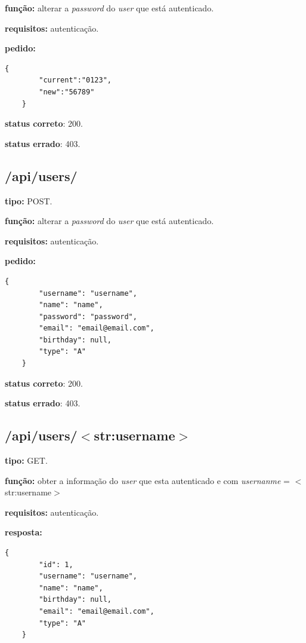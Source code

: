 \documentclass[11pt,a4paper]{report}
\begin{document}
\textbf{função:} alterar a \emph{password} do \emph{user} que está autenticado.

\textbf{requisitos:} autenticação.

\textbf{pedido:}

\begin{lstlisting}[style = code]
   {
        "current":"0123",
        "new":"56789"
    }
\end{lstlisting}

\textbf{status correto}: 200.

\textbf{status errado}: 403.

\newpage

\subsection{/api/users/}

\textbf{tipo:} POST.

\textbf{função:} alterar a \emph{password} do \emph{user} que está autenticado.

\textbf{requisitos:} autenticação.

\textbf{pedido:}

\begin{lstlisting}[style = code]
   {
        "username": "username",
        "name": "name",
        "password": "password",
        "email": "email@email.com",
        "birthday": null,
        "type": "A"
    }
\end{lstlisting}

\textbf{status correto}: 200.

\textbf{status errado}: 403.


\subsection{/api/users/$<$str:username$>$}

\textbf{tipo:} GET.

\textbf{função:} obter a informação do \emph{user} que esta autenticado e com \emph{usernanme} = $<$str:username$>$

\textbf{requisitos:} autenticação.

\textbf{resposta:}

\begin{lstlisting}[style = code]
   {
        "id": 1,
        "username": "username",
        "name": "name",
        "birthday": null,
        "email": "email@email.com",
        "type": "A"
    }
\end{lstlisting}
\end{document}
